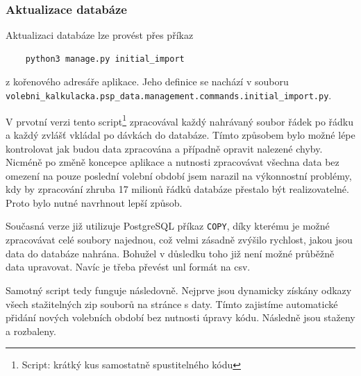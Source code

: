 \subsubsection{Aktualizace databáze}
Aktualizaci databáze lze provést přes příkaz
\begin{verbatim}
    python3 manage.py initial_import
\end{verbatim}
z kořenového adresáře aplikace. Jeho definice se nachází v souboru\\
\texttt{volebni\_kalkulacka.psp\_data.management.commands.initial\_import.py}. \\

\par V prvotní verzi tento script\footnote{Script: krátký kus samostatně spustitelného kódu} zpracovával každý nahrávaný soubor řádek po řádku a každý zvlášť vkládal po dávkách do databáze. Tímto způsobem bylo možné lépe kontrolovat jak budou data zpracována a případně opravit nalezené chyby. Nicméně po změně koncepce aplikace a nutnosti zpracovávat všechna data bez omezení na pouze poslední volební období jsem narazil na výkonnostní problémy, kdy by zpracování zhruba 17 milionů řádků databáze přestalo být realizovatelné.
Proto bylo nutné navrhnout lepší způsob.

\par Současná verze již utilizuje PostgreSQL příkaz \texttt{COPY}, díky kterému je možné zpracovávat celé soubory najednou\cite{psql-copy}, což velmi zásadně zvýšilo rychlost, jakou jsou data do databáze nahrána. Bohužel v důsledku toho již není možné průběžně data upravovat. Navíc je třeba převést unl formát na csv.

\par Samotný script tedy funguje následovně. Nejprve jsou dynamicky získány odkazy všech stažitelných zip souborů na stránce s daty. Tímto zajistíme automatické přidání nových volebních období bez nutnosti úpravy kódu. Následně jsou staženy a rozbaleny. \\

